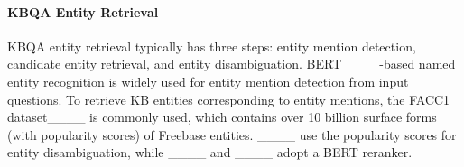 


 \paragraph{KBQA Entity Retrieval}%
KBQA entity retrieval typically has three steps: {entity mention detection}, {candidate entity retrieval}, and {entity disambiguation}. BERT____-based named entity recognition  is widely used for entity mention detection from input questions. %
To retrieve KB entities corresponding to entity mentions, the FACC1 dataset____ is commonly used, which contains over 10 billion surface forms (with popularity scores) of Freebase entities. ____ use the popularity scores for entity disambiguation, while ____ and ____ adopt a BERT reranker. %

